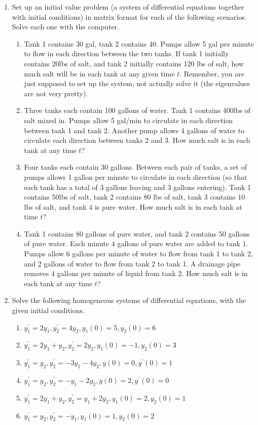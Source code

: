 \begin{multicols}{2}
\begin{enumerate}
\item Set up an initial value problem (a system of differential equations together with initial conditions) in matrix format for each of the following scenarios. Solve each one with the computer.
\begin{enumerate}
	\item Tank 1 contains 30 gal, tank 2 contains 40.  Pumps allow 5 gal per minute to flow in each direction between the two tanks.  If tank 1 initially contains 20lbs of salt, and tank 2 initially contains 120 lbs of salt, how much salt will be in each tank at any given time $t$.  Remember, you are just supposed to set up the system, not actually solve it (the eigenvalues are not very pretty).
	\item Three tanks each contain 100 gallons of water. Tank 1 contains 400lbs of salt mixed in.  Pumps allow 5 gal/min to circulate in each direction between tank 1 and tank 2.  Another pump allows 4 gallons of water to circulate each direction between tanks 2 and 3.  How much salt is in each tank at any time $t$?
	\item Four tanks each contain 30 gallons. Between each pair of tanks, a set of pumps allows 1 gallon per minute to circulate in each direction (so that each tank has a total of 3 gallons leaving and 3 gallons entering). Tank 1 contains 50lbs of salt, tank 2 contains 80 lbs of salt, tank 3 contains 10 lbs of salt, and tank 4 is pure water. How much salt is in each tank at time $t$?
	\item Tank 1 contains 80 gallons of pure water, and tank 2 contains 50 gallons of pure water.  Each minute 4 gallons of pure water are added to tank 1. Pumps allow 6 gallons per minute of water to flow from tank 1 to tank 2, and 2 gallons of water to flow from tank 2 to tank 1.  A drainage pipe removes 4 gallons per minute of liquid from tank 2. How much salt is in each tank at any time $t$?
\end{enumerate}


\item Solve the following homogeneous systems of differential equations, with the given initial conditions.
\begin{enumerate}
	\item $y_1^\prime=2y_1, y_2^\prime=4y_2, y_1(0)=5, y_2(0)=6$
	\item $y_1^\prime=2y_1+y_2, y_2^\prime=2y_2, y_1(0)=-1, y_2(0)=3$
	\item $y_1^\prime = y_2, y_2^\prime =-3y_1 -4y_2, y(0)=0, y^\prime(0)=1$
	\item $y_1^\prime = y_2, y_2^\prime =-y_1 -2y_2, y(0)=2, y^\prime(0)=0$
	\item $y_1^\prime=2y_1+y_2, y_2^\prime=y_1+2y_2, y_1(0)=2, y_2(0)=1$
	\item $y_1^\prime=y_2, y_2^\prime=-y_1, y_1(0)=1, y_2(0)=2$
\end{enumerate}

\end{enumerate}
\end{multicols}
